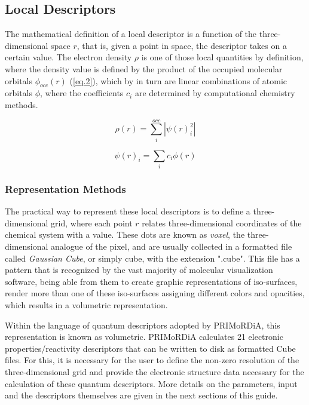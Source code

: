 \documentclass[a4paper,11pt]{refart}
\begin{document}
	\subsection{Local Descriptors}

	The mathematical definition of a local descriptor is a function of the three-dimensional space $r$, that is, given a point in space, the descriptor takes on a certain value. The electron density $\rho$ is one of those local quantities by definition, where the density value is defined by the product of the occupied molecular orbitals $\phi_{occ}(r)$ (\autoref{eq.2}), which by in turn are linear combinations of atomic orbitals $\phi $, where the coefficients $c_i$ are determined by computational chemistry methods.

	\begin{equation}
	\rho(r) = \sum_{i}^{occ} |\psi(r)^2_i|
	\label{eq.2} 
	\end{equation}

	\begin{equation}
	\psi(r)_i = \sum_{i} c_i \phi(r)
	\label{eq.3} 
	\end{equation}

	\subsubsection{Representation Methods}

	The practical way to represent these local descriptors is to define a three-dimensional grid, where each point $r$ relates three-dimensional coordinates of the chemical system with a value. These dots are known as \textit{voxel}, the three-dimensional analogue of the pixel, and are usually collected in a formatted file called \textit{Gaussian Cube}, or simply cube, with the extension ".cube". This file has a pattern that is recognized by the vast majority of molecular visualization software, being able from them to create graphic representations of iso-surfaces, render more than one of these iso-surfaces assigning different colors and opacities, which results in a volumetric representation.

	Within the language of quantum descriptors adopted by PRIMoRDiA, this representation is known as volumetric. PRIMoRDiA calculates 21 electronic properties/reactivity descriptors that can be written to disk as formatted Cube files. For this, it is necessary for the user to define the non-zero resolution of the three-dimensional grid and provide the electronic structure data necessary for the calculation of these quantum descriptors. More details on the parameters, input and the descriptors themselves are given in the next sections of this guide.
\end{document}
